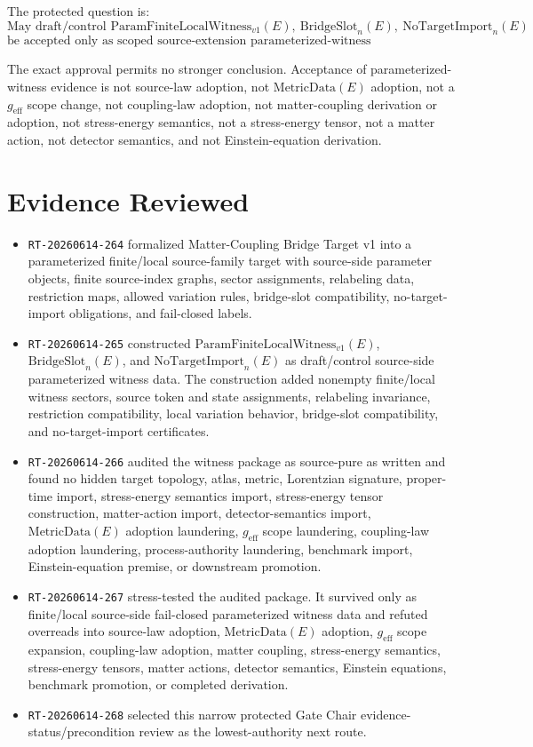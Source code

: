 \documentclass[11pt]{article}
\newcommand{\MetricData}{\mathrm{MetricData}}
\newcommand{\geff}{g_{\mathrm{eff}}}
\newcommand{\ParamWitness}{\mathrm{ParamFiniteLocalWitness}_{v1}}
\newcommand{\BridgeSlot}{\mathrm{BridgeSlot}_{n}}
\newcommand{\NoTargetImport}{\mathrm{NoTargetImport}_{n}}
\begin{document}
The protected question is:
\[
\text{May draft/control }\ParamWitness(E),\ \BridgeSlot(E),\ \NoTargetImport(E)
\]
\[
\text{be accepted only as scoped source-extension parameterized-witness evidence/precondition?}
\]

The exact approval permits no stronger conclusion. Acceptance of
parameterized-witness evidence is not source-law adoption, not
\(\MetricData(E)\) adoption, not a \(\geff\) scope change, not coupling-law
adoption, not matter-coupling derivation or adoption, not stress-energy
semantics, not a stress-energy tensor, not a matter action, not detector
semantics, and not Einstein-equation derivation.

\section{Evidence Reviewed}

\begin{itemize}[leftmargin=*]
  \item \texttt{RT-20260614-264} formalized Matter-Coupling Bridge Target v1
  into a parameterized finite/local source-family target with source-side
  parameter objects, finite source-index graphs, sector assignments, relabeling
  data, restriction maps, allowed variation rules, bridge-slot compatibility,
  no-target-import obligations, and fail-closed labels.
  \item \texttt{RT-20260614-265} constructed \(\ParamWitness(E)\),
  \(\BridgeSlot(E)\), and \(\NoTargetImport(E)\) as draft/control source-side
  parameterized witness data. The construction added nonempty finite/local
  witness sectors, source token and state assignments, relabeling invariance,
  restriction compatibility, local variation behavior, bridge-slot
  compatibility, and no-target-import certificates.
  \item \texttt{RT-20260614-266} audited the witness package as source-pure as
  written and found no hidden target topology, atlas, metric, Lorentzian
  signature, proper-time import, stress-energy semantics import, stress-energy
  tensor construction, matter-action import, detector-semantics import,
  \(\MetricData(E)\) adoption laundering, \(\geff\) scope laundering,
  coupling-law adoption laundering, process-authority laundering, benchmark
  import, Einstein-equation premise, or downstream promotion.
  \item \texttt{RT-20260614-267} stress-tested the audited package. It survived
  only as finite/local source-side fail-closed parameterized witness data and
  refuted overreads into source-law adoption, \(\MetricData(E)\) adoption,
  \(\geff\) scope expansion, coupling-law adoption, matter coupling,
  stress-energy semantics, stress-energy tensors, matter actions, detector
  semantics, Einstein equations, benchmark promotion, or completed derivation.
  \item \texttt{RT-20260614-268} selected this narrow protected Gate Chair
  evidence-status/precondition review as the lowest-authority next route.
\end{itemize}
\end{document}
